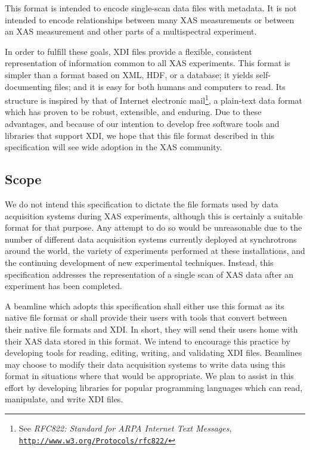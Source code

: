 \documentclass{article}
\newcommand{\xdi}{\textsf{XDI}}
\begin{document}
This format is intended to encode single-scan data files with
metadata.  It is not intended to encode relationships between many XAS
measurements or between an XAS measurement and other parts of a
multispectral experiment.

In order to fulfill these goals, {\xdi} files provide a flexible,
consistent representation of information common to all XAS
experiments.  This format is simpler than a format based on XML, HDF,
or a database; it yields self-documenting files; and it is easy for
both humans and computers to read.  Its structure is inspired by that
of Internet electronic mail\footnote{See \textit{RFC822: Standard for
    ARPA Internet Text Messages},
  \href{http://www.w3.org/Protocols/rfc822/}
  {\texttt{http://www.w3.org/Protocols/rfc822/}}}, a plain-text data
format which has proven to be robust, extensible, and enduring.  Due
to these advantages, and because of our intention to develop free
software tools and libraries that support {\xdi}, we hope that this
file format described in this specification will see wide adoption in
the XAS community.


\subsection{Scope}
\label{sec:scope}

We do not intend this specification to dictate the file formats used
by data acquisition systems during XAS experiments, although this is
certainly a suitable format for that purpose.  Any attempt to do
so would be unreasonable due to the number of different data
acquisition systems currently deployed at synchrotrons around the
world, the variety of experiments performed at these installations,
and the continuing development of new experimental techniques.
Instead, this specification addresses the representation of a single
scan of XAS data after an experiment has been completed.

A beamline which adopts this specification shall either use this
format as its native file format or shall provide their users with
tools that convert between their native file formats and {\xdi}.  In
short, they will send their users home with their XAS data stored in
this format.  We intend to encourage this practice by developing tools
for reading, editing, writing, and validating {\xdi} files.  Beamlines
may choose to modify their data acquisition systems to write data
using this format in situations where that would be appropriate.  We
plan to assist in this effort by developing libraries for popular
programming languages which can read, manipulate, and write {\xdi}
files.
\end{document}
